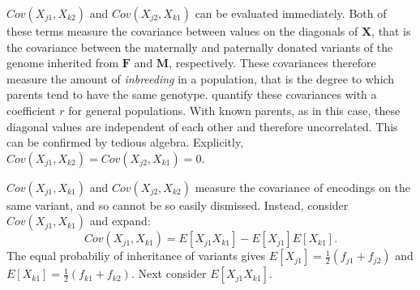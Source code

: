 \documentclass[sts]{imsart}
\newcommand{\m}[1]{\mathbf{#1}}               %
\begin{document}
$Cov(X_{j1}, X_{k2})$ and $Cov(X_{j2}, X_{k1})$ can be evaluated immediately. Both of these terms measure the covariance between values on the diagonals of $\m{X}$, that is the covariance between the maternally and paternally donated variants of the genome inherited from $\m{F}$ and $\m{M}$, respectively. These covariances therefore measure the amount of \emph{inbreeding} in a population, that is the degree to which parents tend to have the same genotype. \cite{crowkimura1970intro} quantify these covariances with a coefficient $r$ for general populations. With known parents, as in this case, these diagonal values are independent of each other and therefore uncorrelated. This can be confirmed by tedious algebra. Explicitly, $Cov(X_{j1}, X_{k2}) = Cov(X_{j2}, X_{k1}) = 0$. 

$Cov(X_{j1}, X_{k1})$ and $Cov(X_{j2}, X_{k2})$ measure the covariance of encodings on the same variant, and so cannot be so easily dismissed. Instead, consider $Cov(X_{j1}, X_{k1})$ and expand:
$$Cov(X_{j1}, X_{k1}) = E[X_{j1} X_{k1}] - E[X_{j1}]E[X_{k1}].$$
The equal probabiliy of inheritance of variants gives $E[X_{j1}] = \frac{1}{2}(f_{j1} + f_{j2})$ and $E[X_{k1}] = \frac{1}{2}(f_{k1} + f_{k2})$. Next consider $E[X_{j1} X_{k1}]$.
\end{document}
